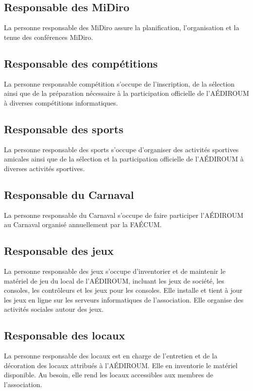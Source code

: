 \documentclass{aediroum}
\begin{document}
\subsection{Responsable des MiDiro}\label{sec:responsable-midiro}
La personne responsable des MiDiro assure la planification, l'organisation et la tenue des conférences MiDiro.

\subsection{Responsable des compétitions}\label{sec:responsable-competition}
La personne responsable compétition s'occupe de l'inscription, de la sélection ainsi que de la préparation nécessaire à la participation officielle de l'AÉDIROUM à diverses compétitions informatiques.

\subsection{Responsable des sports}\label{sec:responsable-sport}
La personne responsable des sports s'occupe d'organiser des activités sportives amicales ainsi que de la sélection et la participation officielle de l'AÉDIROUM à diverses activités sportives.

\subsection{Responsable du Carnaval}\label{sec:responsable-carnaval}
La personne responsable du Carnaval s'occupe de faire participer l'AÉDIROUM au Carnaval organisé annuellement par la FAÉCUM.

\subsection{Responsable des jeux}\label{sec:responsable-serveur}
La personne responsable des jeux s’occupe d’inventorier et de maintenir le matériel de
jeu du local de l’AÉDIROUM, incluant les jeux de société, les consoles, les contrôleurs et
les jeux pour les consoles. Elle installe et tient à jour les jeux en ligne sur les serveurs
informatiques de l’association. Elle organise des activités sociales autour des jeux.

\subsection{Responsable des locaux}
La personne responsable des locaux est en charge de l’entretien et de la décoration des locaux attribués à l’AÉDIROUM. Elle en inventorie le matériel disponible. Au besoin, elle rend les locaux accessibles aux membres de l’association.
\end{document}

